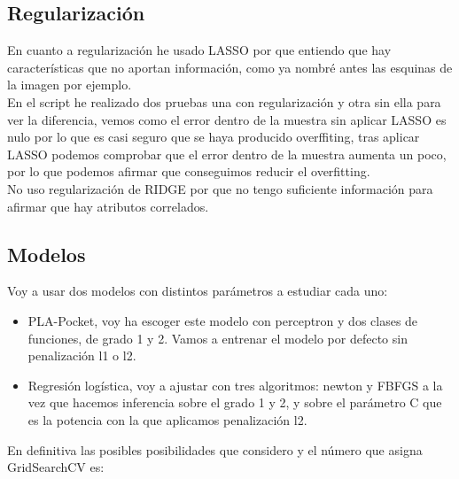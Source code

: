 \documentclass[a4paper,11pt]{article}
\begin{document}
\subsection{Regularización}

En cuanto a regularización he usado LASSO por que entiendo que hay características que no aportan información, como ya nombré antes las esquinas de la imagen por ejemplo.\\

En el script he realizado dos pruebas una con regularización y otra sin ella para ver la diferencia, vemos como el error dentro de la muestra sin aplicar LASSO es nulo por lo que es casi seguro que se haya producido overffiting, tras aplicar LASSO podemos comprobar que el error dentro de la muestra aumenta un poco, por lo que podemos afirmar que conseguimos reducir el overfitting.\\

No uso regularización de RIDGE por que no tengo suficiente información para afirmar que hay atributos correlados.

\subsection{Modelos}

Voy a usar dos modelos con distintos parámetros a estudiar cada uno:

\begin{itemize}
\item PLA-Pocket, voy ha escoger este modelo con perceptron y dos clases de funciones, de grado 1 y 2. Vamos a entrenar el modelo por defecto sin penalización l1 o l2.
\item Regresión logística, voy a ajustar con tres algoritmos: newton y FBFGS a la vez que hacemos inferencia sobre el grado 1 y 2, y sobre el parámetro C que es la potencia con la que aplicamos penalización l2.
\end{itemize}

En definitiva las posibles posibilidades que considero y el número que asigna GridSearchCV es:
\end{document}
